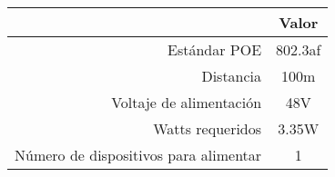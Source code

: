 \begin{tabular}{|r|c|}
  \hline
  \rowcolor[HTML]{E3FFE3} \multicolumn{1}{|c|}{Parámetro} & Valor \\
  \hline
  Estándar POE & 802.3af \\
  \hline
  Distancia & 100m \\
  \hline
  Voltaje de alimentación & 48V \\
  \hline
  Watts requeridos & 3.35W \\
  \hline
  Número de dispositivos para alimentar & 1 \\
  \hline
\end{tabular}